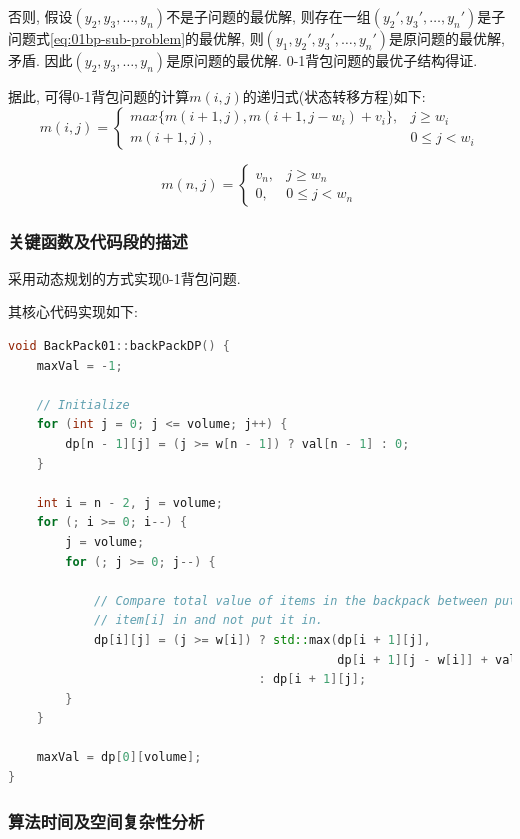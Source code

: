 否则, 假设$(y_2, y_3, \dots, y_n)$不是子问题的最优解, 则存在一组$(y_2',
	y_3', \dots, y_n')$是子问题式\ref{eq:01bp-sub-problem}的最优解, 则$(y_1, y_2',
	y_3', \dots, y_n')$是原问题的最优解, 矛盾. 因此$(y_2, y_3, \dots,
	y_n)$是原问题的最优解. 0-1背包问题的最优子结构得证.

据此, 可得0-1背包问题的计算$m(i, j)$的递归式(状态转移方程)如下:
\begin{equation}
	m(i,j)=\left\{
	\begin{array}{rl}
		max\{m(i+1,j), m(i+1,j-w_i)+v_i\}, & j\geq w_i     \\
		m(i+1,j)                         , & 0\leq j < w_i
	\end{array}
	\right.
\end{equation}

\begin{equation}
	m(n,j)=\left\{
	\begin{array}{rl}
		v_n, & j\geq w_n     \\
		0  , & 0\leq j < w_n
	\end{array}
	\right.
\end{equation}


\subsubsection{关键函数及代码段的描述}
采用动态规划的方式实现0-1背包问题.\par

其核心代码实现如下:

\begin{lstlisting}[language=c++]
void BackPack01::backPackDP() {
    maxVal = -1;

    // Initialize
    for (int j = 0; j <= volume; j++) {
        dp[n - 1][j] = (j >= w[n - 1]) ? val[n - 1] : 0;
    }

    int i = n - 2, j = volume;
    for (; i >= 0; i--) {
        j = volume;
        for (; j >= 0; j--) {

            // Compare total value of items in the backpack between put
            // item[i] in and not put it in.
            dp[i][j] = (j >= w[i]) ? std::max(dp[i + 1][j],
                                              dp[i + 1][j - w[i]] + val[i])
                                   : dp[i + 1][j];
        }
    }

    maxVal = dp[0][volume];
}
\end{lstlisting}

\subsubsection{算法时间及空间复杂性分析}
